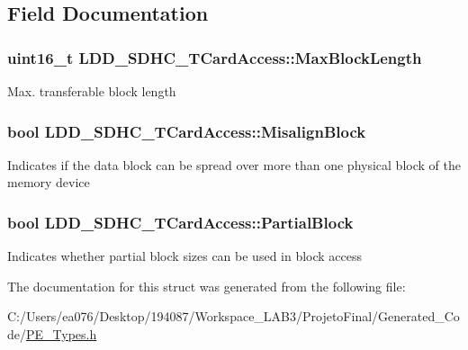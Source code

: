 \subsection{Field Documentation}
\hypertarget{struct_l_d_d___s_d_h_c___t_card_access_aeeba296e7a8dc6164c925b816416ef2e}{
\subsubsection[{Max\-Block\-Length}]{\setlength{\rightskip}{0pt plus 5cm}uint16\-\_\-t L\-D\-D\-\_\-\-S\-D\-H\-C\-\_\-\-T\-Card\-Access\-::\-Max\-Block\-Length}}\label{struct_l_d_d___s_d_h_c___t_card_access_aeeba296e7a8dc6164c925b816416ef2e}
Max. transferable block length \hypertarget{struct_l_d_d___s_d_h_c___t_card_access_aa56e65353fd03ffdbd8cc8d19537b621}{
\subsubsection[{Misalign\-Block}]{\setlength{\rightskip}{0pt plus 5cm}bool L\-D\-D\-\_\-\-S\-D\-H\-C\-\_\-\-T\-Card\-Access\-::\-Misalign\-Block}}\label{struct_l_d_d___s_d_h_c___t_card_access_aa56e65353fd03ffdbd8cc8d19537b621}
Indicates if the data block can be spread over more than one physical block of the memory device \hypertarget{struct_l_d_d___s_d_h_c___t_card_access_a9d78668915e934548a04351b20ec2d0a}{
\subsubsection[{Partial\-Block}]{\setlength{\rightskip}{0pt plus 5cm}bool L\-D\-D\-\_\-\-S\-D\-H\-C\-\_\-\-T\-Card\-Access\-::\-Partial\-Block}}\label{struct_l_d_d___s_d_h_c___t_card_access_a9d78668915e934548a04351b20ec2d0a}
Indicates whether partial block sizes can be used in block access 

The documentation for this struct was generated from the following file\-:\begin{DoxyCompactItemize}
\item 
C\-:/\-Users/ea076/\-Desktop/194087/\-Workspace\-\_\-\-L\-A\-B3/\-Projeto\-Final/\-Generated\-\_\-\-Code/\hyperlink{_p_e___types_8h}{P\-E\-\_\-\-Types.\-h}\end{DoxyCompactItemize}
